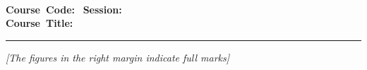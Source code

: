 \begin{center}
	\textbf{\Large{\institutionName{}}}\\[2pt]
	\textbf{\large{\deptName{}}}\\[2pt]
	\textbf{\examName{}}\\[2pt]
	\textbf{Course~Code:}~\courseCode{} \hspace{10mm} \textbf{Session:}~\SessionExaminee\\[2pt]
	\textbf{Course~Title:}~\courseTitle{}\\
	
	
	
\end{center}

\vspace{1mm}
\noindent
{}

\vspace{-2.0mm}
\noindent\rule{\textwidth}{2pt}

\begin{center}
\vspace{-2.0mm}
\textit{[The figures in the right margin indicate full marks]}
\end{center}
\vspace{2mm}
